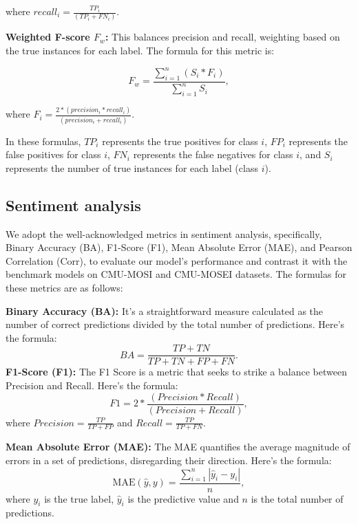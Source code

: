 \documentclass{article} %
\begin{document}
where $recall_i = \frac{TP_i}{(TP_i + FN_i)}$.

\textbf{Weighted F-score $F_w$:} This balances precision and recall, weighting based on the true instances for each label. The formula for this metric is:

\begin{equation}
F_w = \frac{\sum_{i=1}^{n} (S_i * F_i)}{\sum_{i=1}^{n} S_i}, \label{Fw}
\end{equation}

where $F_i = \frac{ 2 * (precision_i * recall_i)}{(precision_i + recall_i)}$.

In these formulas, $TP_i$ represents the true positives for class $i$, $FP_i$ represents the false positives for class $i$, $FN_i$ represents the false negatives for class $i$, and $S_i$ represents the number of true instances for each label (class $i$).

\subsection{Sentiment analysis}

We adopt the well-acknowledged metrics in sentiment analysis, specifically, Binary Accuracy (BA), F1-Score (F1), Mean Absolute Error (MAE), and Pearson Correlation (Corr), to evaluate our model's performance and contrast it with the benchmark models on CMU-MOSI and CMU-MOSEI datasets. The formulas for these metrics are as follows:

\textbf{Binary Accuracy (BA):}  It's a straightforward measure calculated as the number of correct predictions divided by the total number of predictions. Here's the formula: 
\begin{equation}
BA = \frac{TP + TN}{TP + TN + FP + FN}.\label{BA}
\end{equation}
\textbf{F1-Score (F1):}   The F1 Score is a metric that seeks to strike a balance between Precision and Recall. Here's the formula:
\begin{equation}
F1 = 2 * \frac{(Precision * Recall)} {(Precision + Recall)},\label{F1}
\end{equation}
where $Precision=\frac{TP}{TP + FP}$ and $Recall = \frac{TP}{TP + FN}$.

\textbf{Mean Absolute Error (MAE):} The MAE quantifies the average magnitude of errors in a set of predictions, disregarding their direction. Here's the formula: 
\begin{equation}
 \text{MAE}(\hat{y}, y) = \frac{ {\textstyle \sum_{i=1}^{n}}\left | \hat{y}_i-y_i \right |  }{n},  \label{MAE}
\end{equation}
where $y_i$ is the true label, $\hat{y}_i$ is the predictive value and $n$ is the total number of predictions.
\end{document}
